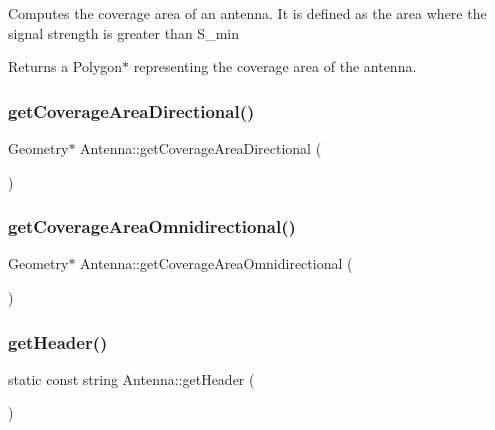 Computes the coverage area of an antenna. It is defined as the area where the signal strength is greater than S\+\_\+min \begin{DoxyReturn}{Returns}
a Polygon$\ast$ representing the coverage area of the antenna. 
\end{DoxyReturn}
\mbox{\label{class_antenna_af5e3d353fcc340b963181514b55bf715}} 
\subsubsection{\texorpdfstring{get\+Coverage\+Area\+Directional()}{getCoverageAreaDirectional()}}
{\footnotesize\ttfamily Geometry$\ast$ Antenna\+::get\+Coverage\+Area\+Directional (\begin{DoxyParamCaption}{ }\end{DoxyParamCaption})\hspace{0.3cm}{\ttfamily [private]}}

\mbox{\label{class_antenna_adaca77948cf68db3348e2819264767f6}} 
\subsubsection{\texorpdfstring{get\+Coverage\+Area\+Omnidirectional()}{getCoverageAreaOmnidirectional()}}
{\footnotesize\ttfamily Geometry$\ast$ Antenna\+::get\+Coverage\+Area\+Omnidirectional (\begin{DoxyParamCaption}{ }\end{DoxyParamCaption})\hspace{0.3cm}{\ttfamily [private]}}

\mbox{\label{class_antenna_abd510d9e41aabe08ffdf45c3ae06acb4}} 
\subsubsection{\texorpdfstring{get\+Header()}{getHeader()}}
{\footnotesize\ttfamily static const string Antenna\+::get\+Header (\begin{DoxyParamCaption}{ }\end{DoxyParamCaption})\hspace{0.3cm}{\ttfamily [static]}}

